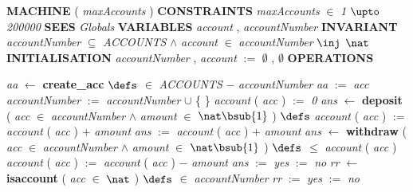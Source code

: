 %
\bsetindent
\begin{tabbing}
\bSetTabs
%
%
\bbnl
{\bf MACHINE} \bhsp{} ( {\em maxAccounts\/} )  \-\label{Bank}
%
%
\bbnl
{\bf CONSTRAINTS} \+ \bbnl
{\em maxAccounts\/} $\in$ {\em 1\/} $\upto$ {\em 200000\/} \-
%
%
\bbnl
{\bf SEES} \+ \bbnl
{\em Globals\/}\label{Globals}  \-
%
%
\bbnl
{\bf VARIABLES} \+ \bbnl
{\em account\/}\label{account}  , {\em accountNumber\/}\label{accountNumber}  \-
%
%
\bbnl
{\bf INVARIANT} \+ \bbnl
{\em accountNumber\/} $\subseteq$ {\em ACCOUNTS\/} $\wedge$ \bnl
{\em account\/} $\in$ {\em accountNumber\/} $\inj$  $\nat$  \-
%
%
\bbnl
{\bf INITIALISATION} \+ \bbnl
{\em accountNumber\/} , {\em account\/} $:=$   $\emptyset$  ,  $\emptyset$  \-
%
%
\bnl\bnl
{\bf OPERATIONS} \+ \bbnl

%
%
{\em aa\/} $\longleftarrow$  {\bf { create\_acc}}  \bhsp $\defs$ \+ \bnl
   \-\bnl
{}  $\in$ {\em ACCOUNTS\/} $-$ {\em accountNumber\/} \-\bnl
{} \+\bnl
{\em aa\/} $:=$  {\em acc\/} \bparallel \bnl
{\em accountNumber\/} $:=$  {\em accountNumber\/} $\cup$  \{  \- \}  \bparallel \bnl
{\em account\/} ( {\em acc\/} )  $:=$  {\em 0\/} \-\bnl
{}  \- \bOperationSemiColon \bbnl
%
%
{\em ans\/} $\longleftarrow$  {\bf { deposit}} ( {\em acc\/} $\in$ {\em accountNumber\/} $\wedge$
{\em amount\/} $\in$  $\nat\bsub{1}$  ) \bhsp $\defs$ \+ \bnl
  \+\bnl
{\em account\/} ( {\em acc\/} )  $:=$  {\em account\/} ( {\em acc\/} )  $+$ {\em amount\/} \bparallel \bnl
{\em ans\/} $:=$  {\em account\/} ( {\em acc\/} )  $+$ {\em amount\/} \-\bnl
{}  \- \bOperationSemiColon \bbnl
%
%
{\em ans\/} $\longleftarrow$  {\bf { withdraw}} ( {\em acc\/} $\in$ {\em accountNumber\/} $\wedge$
{\em amount\/} $\in$  $\nat\bsub{1}$  ) \bhsp $\defs$ \+ \bnl
   $\leq$ {\em account\/} ( {\em acc\/} )  \- \bhsp {} \+\bnl
{\em account\/} ( {\em acc\/} )  $:=$  {\em account\/} ( {\em acc\/} )  $-$ {\em amount\/} \bparallel \bnl
{\em ans\/} $:=$  {\em yes\/} \-\bnl
{}  $:=$  {\em no\/} \-\bnl
{}  \- \bOperationSemiColon \bbnl
%
%
{\em rr\/} $\longleftarrow$  {\bf { isaccount}} ( {\em acc\/} $\in$  $\nat$  ) \bhsp $\defs$ \+ \bnl
   $\in$ {\em accountNumber\/} \- \bhsp {} \+\bnl
{\em rr\/} $:=$  {\em yes\/} \-\bnl
{}  $:=$  {\em no\/} \-\bnl
{}  \-\- \bbnl


\end{tabbing}
